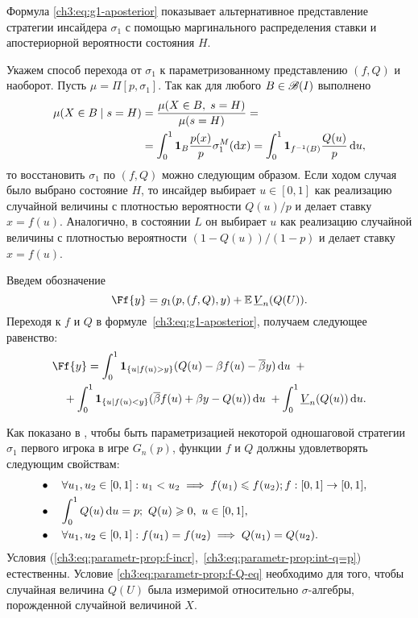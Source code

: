 {Формула \eqref{ch3:eq:g1-aposterior} показывает альтернативное представление стратегии инсайдера $\sigma_1$ с помощью маргинального распределения ставки и апостериорной вероятности состояния $H$.

Укажем способ перехода от $\sigma_1$ к параметризованному представлению $(f, Q)$ и наоборот.
Пусть $\mu = \Pi[p, \sigma_1]$.
Так как для любого $B \in \mathscr{B}(I)$ выполнено
\begin{align*}
  \mu(X \in B \; | \; s = H) 
  &= \frac{\mu(X \in B, \; s = H)}{\mu(s = H)} = \\
  &= \int_0^1 \mathbf{1}_{B} \frac{p(x)}{p} \sigma^M_1(\mathop{}\!\mathrm{d} x) =
  \int_0^1 \mathbf{1}_{f^{-1}(B)} \frac{Q(u)}{p} \mathop{}\!\mathrm{d} u,
\end{align*}
то восстановить $\sigma_1$ по $(f, Q)$ можно следующим образом.
Если ходом случая было выбрано состояние $H$, то инсайдер выбирает $u \in [0, 1]$ как реализацию случайной величины с плотностью вероятности $Q(u)/p$ и делает ставку $x = f(u)$.
Аналогично, в состоянии $L$ он выбирает $u$ как реализацию случайной величины с плотностью вероятности $(1 - Q(u))/(1 - p)$ и делает ставку $x = f(u)$.

Введем обозначение
\[
  \Ff{y} = g_1(p, (f, Q), y) + \E \LV{n}(Q(U)).
\]
Переходя к $f$ и $Q$ в формуле~\eqref{ch3:eq:g1-aposterior}, получаем следующее равенство:
\begin{equation}\label{ch3:eq:F(f,Q,p)}
\begin{multlined}
  \Ff{y} =
  \int_0^1 \Ind{\{u | f(u) > y\}} (Q(u) - \Co f(u) - \DCo y) \di u \enskip + \\
  + \int_0^1 \Ind{\{u | f(u) < y\}} (\DCo f(u) + \Co y - Q(u)) \di u \; + \int_0^1
  \LV{n}(Q(u)) \di u.
\end{multlined}
\end{equation}

Как показано в \cite{demeyer02}, чтобы быть параметризацией некоторой одношаговой стратегии $\sigma_1$ первого игрока в игре $G_n(p)$, функции $f$ и $Q$ должны удовлетворять следующим свойствам:
\begin{subequations}
  \begin{flalign}
    \label{ch3:eq:parametr-prop:f-incr}
    &\bullet\quad \forall u_1, u_2 \in [0, 1]: u_1 < u_2 \implies f(u_1) \leqslant f(u_2); f: [0, 1] \rightarrow [0, 1],&\\
    \label{ch3:eq:parametr-prop:int-q=p}
    &\bullet\quad \int_0^1 Q(u) \mathop{}\!\mathrm{d} u = p;\ Q(u) \geqslant 0,\ u \in [0, 1],&\\
    \label{ch3:eq:parametr-prop:f-Q-eq}
    &\bullet\quad \forall u_1, u_2 \in [0, 1]: f(u_1) = f(u_2) \implies Q(u_1) = Q(u_2).&
  \end{flalign}
\end{subequations}
Условия (\ref{ch3:eq:parametr-prop:f-incr},~\ref{ch3:eq:parametr-prop:int-q=p}) естественны.
Условие \eqref{ch3:eq:parametr-prop:f-Q-eq} необходимо для того, чтобы случайная величина $Q(U)$ была измеримой относительно $\sigma$-алгебры, порожденной случайной величиной $X$.

}
